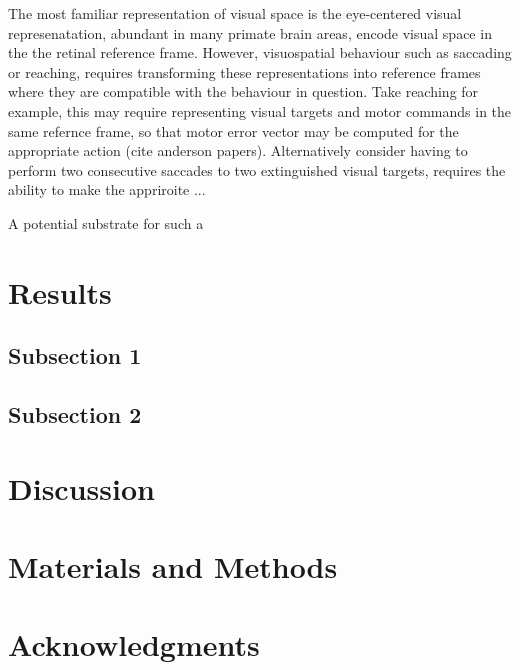\documentclass[10pt]{article}
\begin{document}
The most familiar representation of visual space is the eye-centered visual represenatation, abundant in many primate brain areas, encode visual space in the the retinal reference frame. However, visuospatial behaviour such as saccading or reaching, requires transforming these representations into reference frames where they are compatible with the behaviour in question. Take reaching for example, this may require representing visual targets and motor commands in the same refernce frame, so that motor error vector may be computed for the appropriate action (cite anderson papers). Alternatively consider having to perform two consecutive saccades to two extinguished visual targets, requires the ability to make the appriroite ...

A potential substrate for such a

\section*{Results}

\subsection*{Subsection 1}

\subsection*{Subsection 2}

\section*{Discussion}

\section*{Materials and Methods}

\section*{Acknowledgments}



\end{document}
